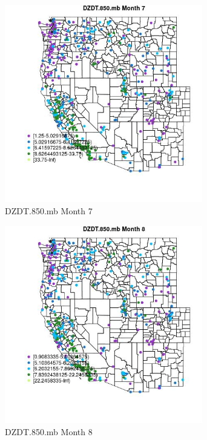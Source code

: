 \begin{figure} 
\centering  
\includegraphics[width=0.77\textwidth]{Code_Outputs/ML_input_report_ML_input_PM25_Step5_part_d_de_duplicated_aves_ML_input_MapObsMo7DZDT850mb.jpg} 
\caption{\label{fig:ML_input_report_ML_input_PM25_Step5_part_d_de_duplicated_aves_ML_inputMapObsMo7DZDT850mb}DZDT.850.mb Month 7} 
\end{figure} 
 

\clearpage 

\begin{figure} 
\centering  
\includegraphics[width=0.77\textwidth]{Code_Outputs/ML_input_report_ML_input_PM25_Step5_part_d_de_duplicated_aves_ML_input_MapObsMo8DZDT850mb.jpg} 
\caption{\label{fig:ML_input_report_ML_input_PM25_Step5_part_d_de_duplicated_aves_ML_inputMapObsMo8DZDT850mb}DZDT.850.mb Month 8} 
\end{figure} 
 

